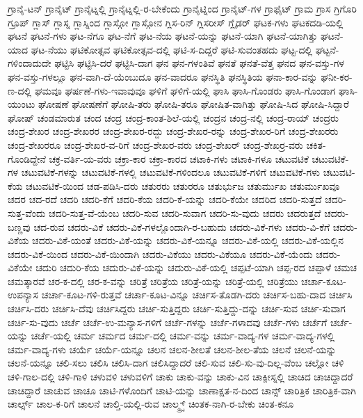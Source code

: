 {ಗ್ರಾನೈ-ಟನ್
ಗ್ರಾನೈಟ್
ಗ್ರಾನೈಟ್ನಲ್ಲಿ
ಗ್ರಾನೈಟ್ನಲ್ಲಿ-ರ-ಬೇಕೆಂದು
ಗ್ರಾನೈಟ್ನಿಂದ
ಗ್ರಾನೈಟ್-ಗಳ
ಗ್ರಾಫೈಟ್
ಗ್ರಾಮ
ಗ್ರಾಸ
ಗ್ರಿಗೊರಿ
ಗ್ರೂಪ್
ಗ್ಲಾಸ್
ಗ್ಲಾಸ್ನ
ಗ್ಲಾಸ್ನಿಂದ
ಗ್ಲಾಸ್ಗೋ
ಗ್ಲಾಸ್ಗೋನ
ಗ್ಲಿಸ-ರಿನ್
ಗ್ಲಿಸರೀಸ್
ಗ್ಲೈಡರ್
ಘಟಕ-ಗಳು
ಘಟಕದಡಿ-ಯಲ್ಲಿ
ಘಟನೆ
ಘಟನೆ-ಗಳು
ಘಟ-ನೆಗೂ
ಘಟ-ನೆಗೆ
ಘಟ-ನೆಯ
ಘಟನೆ-ಯನ್ನು
ಘಟನೆ-ಯಾಗಿ
ಘಟನೆ-ಯಾಗಿತ್ತು
ಘಟನೆ-ಯಾದ
ಘಟ-ನೆಯು
ಘಟಿಕೋತ್ಸವ
ಘಟಿಕೋತ್ಸವ-ದಲ್ಲಿ
ಘಟಿ-ಸ-ದಿದ್ದರೆ
ಘಟಿ-ಸುವಂತಹದು
ಘಟ್ಟ-ದಲ್ಲಿ
ಘಟ್ಟನೆ-ಗಳಿಂದಾದುದೇ
ಘಟ್ಟಿಸಿ
ಘಟ್ಟಿಸಿ-ದರೆ
ಘಟ್ಟಿಸಿ-ದಾಗ
ಘನ
ಘನ-ಗಳಂತಿವೆ
ಘನತೆ
ಘನತೆ-ವೆತ್ತ
ಘನದ
ಘನ-ವಸ್ತು-ಗಳ
ಘನ-ವಸ್ತು-ಗಳಲ್ಲೂ
ಘನ-ವಾಗಿ-ದೆ-ಯೆಂಬುದೂ
ಘನ-ವಾದರೂ
ಘನಸ್ಥಿತಿ
ಘನಸ್ಥಿತಿಯ
ಘನಾ-ಕಾರ-ವನ್ನು
ಘನೀ-ಕರ-ಣ-ದಲ್ಲಿ
ಘಮವೂ
ಘರ್ಷಣೆ-ಗಳು-ಇವಾವುವೂ
ಘಳಿಗೆ
ಘಳಿಗೆ-ಯಲ್ಲಿ
ಘಾಸಿ
ಘಾಸಿ-ಗೊಂಡರು
ಘಾಸಿ-ಗೊಂಡಾಗ
ಘಾಸಿ-ಯುಂಟು
ಘೋಷಣೆ
ಘೋಷಣೆಗೆ
ಘೋಷಿ-ತರು
ಘೋಷಿ-ತರೂ
ಘೋಷಿತ-ವಾಗಿತ್ತು
ಘೋಷಿ-ಸಿದ
ಘೋಷಿ-ಸಿದ್ದಾರೆ
ಘೋಷ್
ಚಂಡಮಾರುತ
ಚಂದ
ಚಂದ್ರ
ಚಂದ್ರ-ಕಾಂತ-ಶಿಲೆ-ಯಲ್ಲಿ
ಚಂದ್ರನ
ಚಂದ್ರ-ನಲ್ಲಿ
ಚಂದ್ರ-ರಾಯ್
ಚಂದ್ರರು
ಚಂದ್ರ-ಶೇಖರ
ಚಂದ್ರ-ಶೇಖರರ
ಚಂದ್ರ-ಶೇಖರ-ರದ್ದು
ಚಂದ್ರ-ಶೇಖರ-ರನ್ನು
ಚಂದ್ರ-ಶೇಖರ-ರಿಗೆ
ಚಂದ್ರ-ಶೇಖರರು
ಚಂದ್ರ-ಶೇಖರರೂ
ಚಂದ್ರ-ಶೇಖರ-ವ-ರಿಗೆ
ಚಂದ್ರ-ಶೇಖರ-ವರು
ಚಂದ್ರ-ಶೇಖರ್
ಚಂದ್ರ-ಶೇಖರ್ರ-ವರು
ಚಕಿತ-ಗೊಂಡಿದ್ದೇನೆ
ಚಕ್ರ-ವರ್ತಿ-ಯ-ವರು
ಚಕ್ರಾ-ಕಾರ
ಚಕ್ರಾ-ಕಾರದ
ಚಟಾಕಿ-ಗಳು
ಚಟಾಕಿ-ಗಳೂ
ಚಟುವಟಿಕೆ
ಚಟುವಟಿಕೆ-ಗಳ
ಚಟುವಟಿಕೆ-ಗಳನ್ನು
ಚಟುವಟಿಕೆ-ಗಳಲ್ಲಿ
ಚಟುವಟಿಕೆ-ಗಳಿಂದಲೂ
ಚಟುವಟಿಕೆ-ಗಳಿಗೆ
ಚಟುವಟಿಕೆ-ಗಳು
ಚಟುವಟಿ-ಕೆಯ
ಚಟುವಟಿಕೆ-ಯಿಂದ
ಚಡ-ಪಡಿಸಿ-ದರು
ಚತುರರು
ಚತುರರೂ
ಚತುರ್ಭುಜ
ಚತುರ್ಮುಖ
ಚತುರ್ಮುಖವೂ
ಚದರ
ಚದ-ರದೆ
ಚದರಿ
ಚದರಿ-ಕೆಗೆ
ಚದರಿ-ಕೆಯ
ಚದರಿ-ಕೆ-ಯನ್ನು
ಚದರಿ-ಕೆಯೇ
ಚದರಿದ
ಚದರಿ-ಸುತ್ತದೆ
ಚದರಿ-ಸುತ್ತ-ವೆಂದು
ಚದರಿ-ಸುತ್ತ-ವೆ-ಯೆಂಬ
ಚದರಿ-ಸುವ
ಚದರಿ-ಸುವಾಗ
ಚದರಿ-ಸು-ವುದು
ಚದರು
ಚದರುತ್ತದೆ
ಚದರು-ಬಣ್ಣವು
ಚದ-ರುವ
ಚದರು-ವಿಕೆ
ಚದರು-ವಿಕೆ-ಗಳಲ್ಲೊಂದಾಗಿ-ರ-ಬಹುದು
ಚದರು-ವಿಕೆ-ಗಳು
ಚದರು-ವಿ-ಕೆಗೆ
ಚದರು-ವಿಕೆಯ
ಚದರು-ವಿಕೆ-ಯಂತೆ
ಚದರು-ವಿಕೆ-ಯನ್ನು
ಚದರು-ವಿಕೆ-ಯನ್ನೂ
ಚದರು-ವಿಕೆ-ಯಲ್ಲಿ
ಚದರು-ವಿಕೆ-ಯಲ್ಲಿನ
ಚದರು-ವಿಕೆ-ಯಿಂದ
ಚದರು-ವಿಕೆ-ಯಿಂದಾಗಿ
ಚದರು-ವಿಕೆಯು
ಚದರು-ವಿಕೆಯೂ
ಚದರು-ವಿಕೆ-ಯೆಂದು
ಚದರು-ವಿಕೆಯೇ
ಚದುರಿ
ಚದುರಿ-ಕೆಯ
ಚದುರು-ವಿಕೆ-ಯನ್ನು
ಚದುರು-ವಿಕೆ-ಯಲ್ಲಿ
ಚಪ್ಪಟೆ-ಯಾಗಿ
ಚಪ್ಪ-ರದ
ಚಪ್ಪಾಳೆ
ಚಮಚ
ಚಮತ್ಕಾರವೆ
ಚರ-ಕ-ದಲ್ಲಿ
ಚರ-ಕ-ವನ್ನು
ಚರಿತ್ರೆ
ಚರಿತ್ರೆಯ
ಚರಿತ್ರೆ-ಯನ್ನು
ಚರಿತ್ರೆ-ಯಲ್ಲಿ
ಚರಿತ್ರೆಯು
ಚರ್ಚಾ-ಕೂಟ-ಉಪನ್ಯಾಸ
ಚರ್ಚಾ-ಕೂಟ-ಗಳಿ-ರುತ್ತವೆ
ಚರ್ಚಾ-ಕೂಟ-ವಿನ್ನೂ
ಚರ್ಚಿಸ-ತೊಡಗಿ-ದರು
ಚರ್ಚಿಸ-ಬಹು-ದಾದ
ಚರ್ಚಿಸಿ
ಚರ್ಚಿಸಿ-ದರು
ಚರ್ಚಿಸಿ-ದೆವು
ಚರ್ಚಿಸಿದ್ದರು
ಚರ್ಚಿ-ಸುತ್ತಿದ್ದರು
ಚರ್ಚಿ-ಸುತ್ತಿದ್ದು-ದನ್ನು
ಚರ್ಚಿ-ಸುವ
ಚರ್ಚಿ-ಸುವಾಗ
ಚರ್ಚಿ-ಸು-ವುದು
ಚರ್ಚೆ
ಚರ್ಚೆ-ಉ-ಮನ್ಯಾಸ-ಗಳಿಗೆ
ಚರ್ಚೆ-ಗಳನ್ನು
ಚರ್ಚೆ-ಗಳಾದವು
ಚರ್ಚೆ-ಗಳು
ಚರ್ಚೆಗೆ
ಚರ್ಚೆ-ಯನ್ನು
ಚರ್ಚೆ-ಯಲ್ಲಿ
ಚರ್ಮ
ಚರ್ಮದ
ಚರ್ಮ-ದಲ್ಲಿ
ಚರ್ಮ-ವನ್ನು
ಚರ್ಮ-ವಾದ್ಯ-ಗಳ
ಚರ್ಮ-ವಾದ್ಯ-ಗಳಲ್ಲಿ
ಚರ್ಮ-ವಾದ್ಯ-ಗಳು
ಚರ್ಯೆ
ಚರ್ಯೆ-ಯನ್ನೂ
ಚಲನ
ಚಲನ-ಶೀಲತೆ
ಚಲನ-ಶೀಲ-ತೆಯ
ಚಲನೆ
ಚಲನೆ-ಯನ್ನು
ಚಲನೆ-ಯನ್ನೂ
ಚಲಿ-ಸಲು
ಚಲಿಸಿ
ಚಲಿಸಿ-ದಾಗ
ಚಲಿಸಿದ್ದಾದರೆ
ಚಲಿ-ಸುವ
ಚಲಿ-ಸು-ವು-ದಿಲ್ಲ-ವೆಂಬ
ಚಲ್ಲೋ
ಚಳಿ
ಚಳಿ-ಗಾಲ-ದಲ್ಲಿ
ಚಳಿ-ಗಾಳಿ
ಚಳುವಳಿ
ಚಳುವಳಿಗೆ
ಚಾಕು
ಚಾಕು-ವನ್ನು
ಚಾಕು-ವಿನ
ಚಾಕ್ಪೀಸ್ನಲ್ಲಿ
ಚಾಚಿದ
ಚಾಚಿದ್ದಾದರೆ
ಚಾಚಿದ್ದಾರೆ
ಚಾಚುವ
ಚಾಚೂ
ಚಾಟಿ-ಗಳೊಂದಿಗೆ
ಚಾಟಿ-ಯನ್ನು
ಚಾಣಾಕ್ಷತ-ನ-ದಿಂದ
ಚಾನ್ಸ್
ಚಾರಿತ್ರಿಕ
ಚಾರಿತ್ರಿಕ-ವಾಗಿ
ಚಾರ್ಲ್ಸ್
ಚಾಲ-ಕ-ರಿಗೆ
ಚಾಲನೆ
ಚಾಲ್ತಿ-ಯಲ್ಲಿ-ರುವ
ಚಾಲ್ಮ್ರ್ಸ್
ಚಿಂತಕ-ನಾಗಿ-ರ-ಬೇಕು
ಚಿಂತ-ಕನೂ
}
